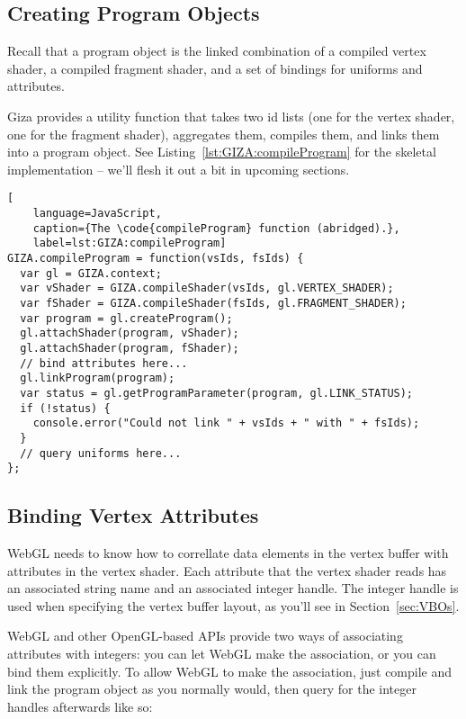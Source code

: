 \subsection{Creating Program Objects}

Recall that a  program object is the linked combination of a compiled vertex shader, a compiled fragment shader, and a set of bindings for uniforms and attributes.

Giza provides a utility function that takes two id lists (one for the vertex shader, one for the fragment shader), aggregates them, compiles them, and links them into a program object.  See Listing~\ref{lst:GIZA:compileProgram} for the skeletal implementation -- we'll flesh it out a bit in upcoming sections.

\begin{lstlisting}[
    language=JavaScript,
    caption={The \code{compileProgram} function (abridged).},
    label=lst:GIZA:compileProgram]
GIZA.compileProgram = function(vsIds, fsIds) {
  var gl = GIZA.context;
  var vShader = GIZA.compileShader(vsIds, gl.VERTEX_SHADER);
  var fShader = GIZA.compileShader(fsIds, gl.FRAGMENT_SHADER);
  var program = gl.createProgram();
  gl.attachShader(program, vShader);
  gl.attachShader(program, fShader);
  // bind attributes here...
  gl.linkProgram(program);
  var status = gl.getProgramParameter(program, gl.LINK_STATUS);
  if (!status) {
    console.error("Could not link " + vsIds + " with " + fsIds);
  }
  // query uniforms here...
};
\end{lstlisting}

\subsection{Binding Vertex Attributes}

WebGL needs to know how to correllate data elements in the vertex buffer with attributes in the vertex shader.  Each attribute that the vertex shader reads has an associated string name and an associated integer handle.  The integer handle is used when specifying the vertex buffer layout, as you'll see in Section~\ref{sec:VBOs}.

WebGL and other OpenGL-based APIs provide two ways of associating attributes with integers: you can let WebGL make the association, or you can bind them explicitly.  To allow WebGL to make the association, just compile and link the program object as you normally would, then query for the integer handles afterwards like so:

